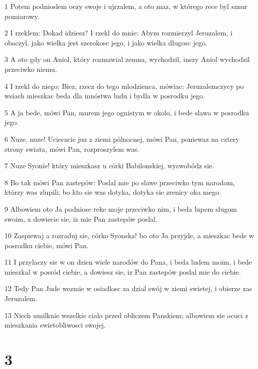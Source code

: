 \par 1 Potem podnioslem oczy swoje i ujrzalem, a oto maz, w którego rece byl sznur pomiarowy.
\par 2 I rzeklem: Dokad idziesz? I rzekl do mnie: Abym rozmierzyl Jeruzalem, i obaczyl, jako wielka jest szerokosc jego, i jako wielka dlugosc jego.
\par 3 A oto gdy on Aniol, który rozmawial zemna, wychodzil, inszy Aniol wychodzil przeciwko niemu.
\par 4 I rzekl do niego: Biez, rzecz do tego mlodzienca, mówiac: Jeruzalemczycy po wsiach mieszkac beda dla mnóstwa ludu i bydla w posrodku jego.
\par 5 A ja bede, mówi Pan, murem jego ognistym w okolo, i bede slawa w posrodku jego.
\par 6 Nuze, nuze! Ucieczcie juz z ziemi pólnocnej, mówi Pan, poniewaz na cztery strony swiata, mówi Pan, rozproszylem was.
\par 7 Nuze Syonie! który mieszkasz u córki Babilonskiej, wyswobódz sie.
\par 8 Bo tak mówi Pan zastepów: Poslal mie po slawe przeciwko tym narodom, którzy was zlupili; bo kto sie was dotyka, dotyka sie zrenicy oka mego.
\par 9 Albowiem oto Ja podniose reke moje przeciwko nim, i beda lupem slugom swoim, a dowiecie sie, iz mie Pan zastepów poslal.
\par 10 Zaspiewaj a rozraduj sie, córko Syonska! bo oto Ja przyjde, a mieszkac bede w posrodku ciebie, mówi Pan.
\par 11 I przylaczy sie w on dzien wiele narodów do Pana, i beda ludem moim, i bede mieszkal w posród ciebie, a dowiesz sie, iz Pan zastepów poslal mie do ciebie.
\par 12 Tedy Pan Jude wezmie w osiadlosc za dzial swój w ziemi swietej, i obierze zas Jeruzalem.
\par 13 Niech umilknie wszelkie cialo przed obliczem Panskiem; albowiem sie ocuci z mieszkania swietobliwosci swojej.

\chapter{3}

